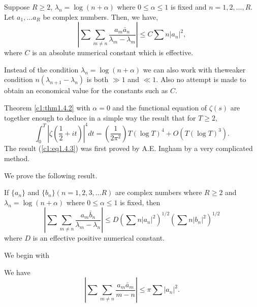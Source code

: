 \begin{theorem}\label{c1:thm1.4.2}
Suppose $R \geq 2$, $\lambda_n = \log (n+\alpha)$ where $0 \leq \alpha \leq 1$ is fixed and $n = 1,2, \ldots, R$. Let $a_1, \ldots a_R$ be complex numbers. Then, we have,
\begin{equation*}
\left| \sum\sum\limits_{m\neq n} \frac{a_m\bar{a}_n}{\lambda_m - \lambda_m}\right| \leq C \sum n |a_n|^2, \tag{1.4.2}\label{c1:eq1.4.2}
\end{equation*}
where $C$ is an absolute numerical constant which is effective.
\end{theorem}

\setcounter{remark}{0}
\begin{remark}\label{c1:rem1b}
Instead of the condition $\lambda_n = \log (n+\alpha)$ we can also work with the\pageoriginale weaker condition $n(\lambda_{n+1} - \lambda_n)$ is both $\gg 1$ and $\ll 1$. Also no attempt is made to obtain an economical value for the constants such as $C$.
\end{remark}

\begin{remark}\label{c1:rem2b}
Theorem \ref{c1:thm1.4.2} with $\alpha =0$ and the functional equation of $\zeta(s)$ are together enough to deduce in a simple way the result that for $T \geq 2$,
\begin{equation*}
\int^T_0 \left|\zeta \left(\frac{1}{2} + it \right) \right|^4 dt = \left(\frac{1}{2\pi^2} \right) T (\log T)^4 + O(T(\log T)^3). \tag{1.4.3}\label{c1:eq1.4.3}
\end{equation*}
The result (\ref{c1:eq1.4.3}) was first proved by A.E. Ingham by a very complicated method.

We prove the following result.
\end{remark}

\begin{theorem}\label{c1:thm1.4.3}
If $\{a_n\}$ and $\{b_n\} (n=1,2,3,\ldots R)$ are complex numbers where $R \geq 2$ and $\lambda_n = \log (n+\alpha)$ where $0 \leq \alpha \leq 1$ is fixed, then
$$
\left| \sum\sum\limits_{m \neq n} \frac{a_m\bar{b}_n}{\lambda_m - \lambda_n}\right| \leq D \left( \sum n |a_n|^2\right)^{1/2} \left( \sum n |b_n|^2\right)^{1/2}
$$
where $D$ is an effective positive numerical constant.
\end{theorem}

We begin with 

\setcounter{lem}{0}
\begin{lem}\label{c1:lem1c}
We have
$$
\left| \sum \sum\limits_{m \neq n} \frac{a_m \bar{a}_m}{m -n}\right| \leq  \pi \sum |a_n|^2. 
$$
\end{lem}

